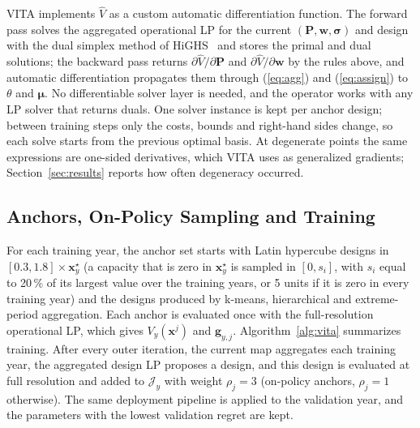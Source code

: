 \documentclass[journal]{IEEEtran}
\begin{document}
VITA implements $\hat{V}$ as a custom automatic differentiation function. The forward pass solves the aggregated operational LP for the current $(\bm{P},\bm{w},\bm{\sigma})$ and design with the dual simplex method of HiGHS~\cite{huangfu2018highs} and stores the primal and dual solutions; the backward pass returns $\partial\hat{V}/\partial\bm{P}$ and $\partial\hat{V}/\partial\bm{w}$ by the rules above, and automatic differentiation propagates them through (\ref{eq:agg}) and (\ref{eq:assign}) to $\theta$ and $\bm{\mu}$. No differentiable solver layer is needed, and the operator works with any LP solver that returns duals. One solver instance is kept per anchor design; between training steps only the costs, bounds and right-hand sides change, so each solve starts from the previous optimal basis. At degenerate points the same expressions are one-sided derivatives, which VITA uses as generalized gradients; Section~\ref{sec:results} reports how often degeneracy occurred.

\subsection{Anchors, On-Policy Sampling and Training}
For each training year, the anchor set starts with Latin hypercube designs in $[0.3,1.8]\times\bm{x}^{\star}_y$ (a capacity that is zero in $\bm{x}^{\star}_y$ is sampled in $[0,s_i]$, with $s_i$ equal to 20\,\% of its largest value over the training years, or 5 units if it is zero in every training year) and the designs produced by k-means, hierarchical and extreme-period aggregation. Each anchor is evaluated once with the full-resolution operational LP, which gives $V_y(\bm{x}^{j})$ and $\bm{g}_{y,j}$. Algorithm~\ref{alg:vita} summarizes training. After every outer iteration, the current map aggregates each training year, the aggregated design LP proposes a design, and this design is evaluated at full resolution and added to $\mathcal{J}_y$ with weight $\rho_j=3$ (on-policy anchors, $\rho_j=1$ otherwise). The same deployment pipeline is applied to the validation year, and the parameters with the lowest validation regret are kept.
\end{document}
